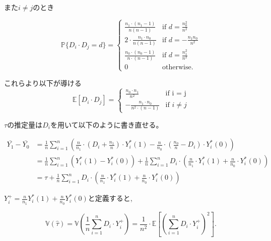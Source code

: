 \documentclass[a4paper]{bxjsarticle}
\begin{document}
また$i \neq j$のとき

\begin{equation}
 \mathbb{P}\{D_i \cdot D_j = d\} =　
  \begin{cases}
   \frac{n_1\cdot(n_1 -1)}{n(n-1)} & \text{if $d = \frac{n_0^2}{n^2}$} \\
   2 \cdot \frac{n_1\cdot n_0}{n(n-1)} & \text{if $d =- \frac{n_1n_0}{n^2}$} \\
   \frac{n_0 \cdot (n_0-1)}{n \cdot (n-1)} & \text{if $d = \frac{n_1 ^2}{n^2}$} \\
   0 & \text{otherwise}.
  \end{cases}
\end{equation}

これらより以下が導ける
\begin{equation}
\mathbb{E}\left[D_i \cdot D_j\right] =
\begin{cases}
 \frac{n_0 \cdot n_1}{n^2} & \text{if i = j} \\
 - \frac{n_1 \cdot n_0}{n^2 \cdot (n-1)} & \text{if $i \neq j$}
\end{cases}
\end{equation}

$\tau$の推定量は$D_i$を用いて以下のように書き直せる。

\begin{equation}
    \begin{split}
        \bar{Y_1} - \bar{Y_0} &= \frac{1}{n} \sum_{i=1}^n \left(\frac{n}{n_1} \cdot \left(D_i + \frac{n_1}{n}\right) \cdot Y_i^\ast(1)- \frac{n}{n_0} \cdot \left(\frac{n_0}{n} - D_i \right) \cdot Y_i^\ast(0) \right) \\\
        &=\frac{1}{n}\sum_{i=1}^n \left(Y_i^\ast(1) - Y_i^\ast(0) \right) + \frac{1}{n}\sum_{i=1}^n D_i \cdot \left(\frac{n}{n_1} \cdot Y_i^\ast(1) + \frac{n}{n_0} \cdot Y_i^\ast(0) \right) \\\
        &=\tau + \frac{1}{n} \sum_{i=1}^n D_i \cdot \left(\frac{n}{n_1} \cdot Y_i^\ast(1) + \frac{n}{n_0} \cdot Y_i^\ast(0) \right)
    \end{split}
\end{equation}

$Y_i^+ = \frac{n}{n_1}Y_i^\ast(1) + \frac{n}{n_0}Y_i^\ast(0)$と定義すると,

\begin{equation}
\mathbb{V}(\hat{\tau}) = \mathbb{V}\left(\frac{1}{n} \sum_{i = 1}^n D_i \cdot Y_i^+ \right) = \frac{1}{n^2} \cdot \mathbb{E} \left[ \left( \sum_{i=1}^n D_i \cdot Y_i^+ \right)^2  \right]. \label{eq:randomization_unbiased_var}  \end{equation}
\end{document}
